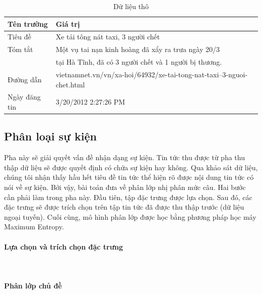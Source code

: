 \begin{table}
	\centering
\caption{Dữ liệu thô}
  \begin{tabular}{|l|l|}
     \hline
     \textbf{Tên trường} & \textbf{Giá trị} \\
     \hline
     Tiêu đề & Xe tải tông nát taxi, 3 người chết \\
     \hline
     Tóm tắt & Một vụ tai nạn kinh hoàng đã xẩy ra trưa ngày 20/3 \\
     $\;$ $\;$ $\;$ $\;$ $\;$ $\;$ $\;$ $\;$ &	tại Hà Tĩnh, đã có 3 người chết và 1 người bị thương. \\
     \hline
     Đường dẫn & vietnamnet.vn/vn/xa-hoi/64932/xe-tai-tong-nat-taxi--3-nguoi-chet.html \\
     \hline
     Ngày đăng tin & 3/20/2012 2:27:26 PM \\
     \hline
  \end{tabular}

  \label{tb:rawdata}
\end{table}



\subsection{Phân loại sự kiện}
\label{classifi}

\noindent Pha này sẽ giải quyết vấn đề nhận dạng sự kiện. Tin tức thu được từ pha  thu thập dữ liệu sẽ được quyết định có chứa sự kiện hay không. Qua khảo sát dữ liệu, chúng tôi nhận thấy hầu hết tiêu đề tin tức thể hiện rõ được nội dung tin tức có nói về sự kiện. Bởi vậy, bài toán đưa về phân lớp nhị phân mức câu. Hai bước cần phải làm trong pha này. Đầu tiên, tập đặc trưng được lựa chọn. Sau đó, các đặc trưng sẽ được trích chọn trên tập tin tức đã được thu thập trước (dữ liệu ngoại tuyến). Cuối cùng, mô hình phân lớp được học bằng  phương pháp học máy Maximum Entropy.

\paragraph{Lựa chọn và trích chọn đặc trưng}  $\;$ \\


\paragraph{Phân lớp chủ đề} $\;$ \\
\noindent



